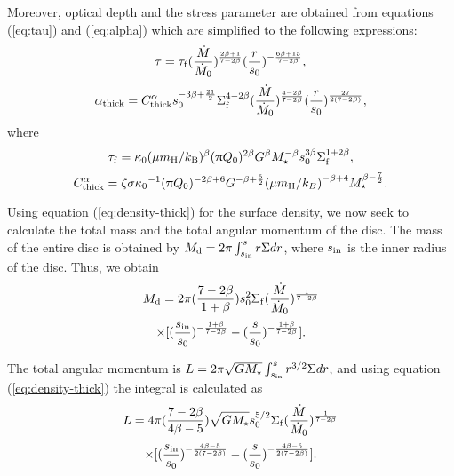 \documentclass[apj]{emulateapj}
\begin{document}
Moreover, optical depth and the stress parameter are obtained from equations (\ref{eq:tau}) and (\ref{eq:alpha}) which are simplified to the following expressions:
%
\begin{equation}
\tau = \tau_{\rm f} (\frac{\dot{M}}{\dot{M}_0})^{\frac{2\beta +1}{7-2\beta}} (\frac{r}{s_0})^{-\frac{6\beta + 15}{7-2\beta}},
\end{equation}
%
\begin{equation}
\alpha_{\rm thick}=C_{\rm thick}^{\alpha} s_{0}^{-3\beta + \frac{21}{2}} \Sigma_{\rm f}^{4-2\beta} (\frac{\dot{M}}{\dot{M}_0})^{\frac{4-2\beta}{7-2\beta}} (\frac{r}{s_0})^{\frac{27}{2(7-2\beta)}},
\end{equation}
%
where
%
\begin{equation}
\tau_{\rm f}= \kappa_{0} (\mu m_{\rm H}/k_{\rm B})^{\beta} (\uppi Q_0 )^{2\beta } G^{\beta} M_{\star}^{-\beta} s_{0}^{3\beta} \Sigma_{\rm f}^{1+2\beta},
\end{equation}
%
\begin{equation}
C_{\rm thick}^{\alpha}= \zeta \sigma {\kappa_0}^{-1}  {(\uppi Q_0)^{-2\beta+6}} G^{-\beta+\frac{5}{2}}  {(\mu m_{\rm H}/k_B)}^{-\beta+4} M_{\star}^{\beta-\frac{7}{2}}.
\end{equation}


Using equation (\ref{eq:density-thick}) for the surface density, we now seek to calculate the total mass and the total angular momentum of the disc. The mass of the entire disc is obtained by  $M_{\rm d}=2\pi \int_{s_{\rm in}}^{s} r\Sigma dr$, where $s_{\rm in}$ is the inner radius of the disc. Thus, we obtain
%
\begin{displaymath}
M_{\rm d}=2\pi (\frac{ 7-2\beta }{1+\beta }) s_{0}^{2} \Sigma_{\rm f} (\frac{\dot{M}}{\dot{M}_0 })^{\frac{1}{7-2\beta}} 
\end{displaymath}
%
\begin{equation}\label{eq:Md-thick0}
\times [(\frac{s_{\rm in}}{s_0 })^{-\frac{1+\beta}{7-2\beta}} - (\frac{s}{s_0})^{-\frac{1+\beta}{7-2\beta}}].
\end{equation}
%
%

The total angular momentum is $L=2\pi \sqrt{G M_{\star}} \int_{s_{\rm in}}^{s} r^{3/2}  \Sigma dr $, and using equation (\ref{eq:density-thick}) the integral is calculated as
%
\begin{displaymath}
L=4\pi (\frac{7-2\beta}{4\beta -5}) \sqrt{GM_{\star}} s_{0}^{5/2} \Sigma_{\rm f} (\frac{\dot{M}}{\dot{M}_0 })^{\frac{1}{7-2\beta}} 
\end{displaymath}
\begin{equation}\label{eq:L-thick0}
\times [(\frac{s_{\rm in}}{s_0 })^{-\frac{4\beta -5}{2(7-2\beta)}} - (\frac{s}{s_0})^{-\frac{4\beta -5}{2(7-2\beta)}}].
\end{equation}
%
%
\end{document}
